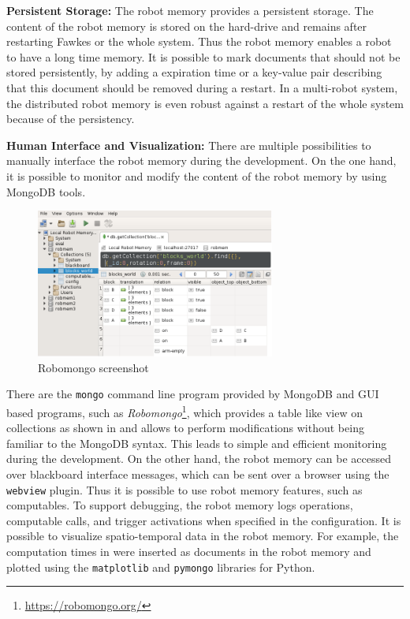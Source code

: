 \textbf{Persistent Storage:}
The robot memory provides a persistent storage. The content of the
robot memory is stored on the hard-drive and remains after restarting
Fawkes or the whole system. Thus the robot memory enables a robot to
have a long time memory. It is possible to mark documents that should
not be stored persistently, by adding a expiration time or a key-value
pair describing that this document should be removed during a restart.
In a multi-robot system, the distributed robot memory is even robust against a
restart of the whole system because of the persistency.

\textbf{Human Interface and Visualization:}
There are multiple possibilities to manually interface the robot
memory during the development. On the one hand, it is possible to
monitor and modify the content of the robot memory by using MongoDB
tools.
\begin{figure}
  \centering
  \vspace{-4mm}
  \includegraphics[width=0.7\textwidth]{img/robomongo-small}%
  \caption[Robomongo screenshot]{Robomongo screenshot}
  \vspace{-5mm}
  \label{fig:robomongo}
\end{figure}
There are the \texttt{mongo} command line program provided by
MongoDB and GUI based programs, such as
\emph{Robomongo}\footnote{\url{https://robomongo.org/}}, which
provides a table like view on collections as shown in  and allows to perform
modifications without being familiar to the MongoDB syntax. This
leads to simple and efficient monitoring during the development.
On the other hand, the robot memory can be
accessed over blackboard interface messages, which can be sent over a
browser using the \texttt{webview} plugin. Thus it is possible to use
robot memory features, such as computables. To support debugging, the
robot memory logs operations, computable calls, and trigger
activations when specified in the configuration. It is possible to
visualize spatio-temporal data in the robot memory. For example, the
computation times in  were inserted as
documents in the robot memory and plotted using the
\texttt{matplotlib} and \texttt{pymongo} libraries for Python.

